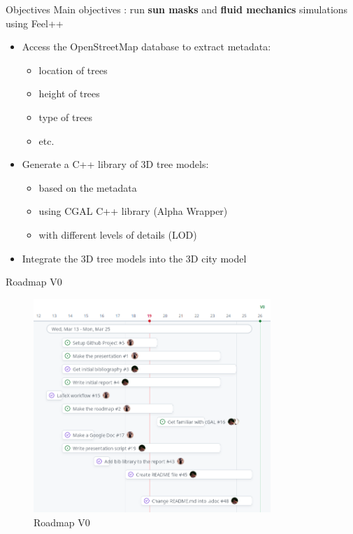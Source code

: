 \documentclass[10pt]{beamer}
\begin{document}
\begin{frame}{Objectives}
  Main objectives : run \textbf{sun masks} and \textbf{fluid mechanics} simulations using Feel++\cite{feel++} \\
  \vspace{0.5cm}

  \begin{itemize}
    \item<2-> Access the OpenStreetMap\cite{overpass} database to extract metadata:
    \begin{itemize}
      \item<3-> location of trees
      \item<4-> height of trees
      \item <5-> type of trees
      \item <6-> etc.
    \end{itemize}
    \item<7-> Generate a C++ library of 3D tree models:
    \begin{itemize}
      \item <8-> based on the metadata
      \item <9-> using CGAL\cite{cgal} C++ library (Alpha Wrapper)
      \item <10-> with different levels of details (LOD)
    \end{itemize}
    \item<11-> Integrate the 3D tree models into the 3D city model
  \end{itemize}
\end{frame}

\begin{frame}{Roadmap V0}
  \begin{figure}[h] %
    \centering
    \includegraphics[width=0.8\textwidth]{images/roadmap_v0.png}
    \caption{Roadmap V0} %
    \label{fig:roadmap0} %
    \end{figure}
\end{frame}
\end{document}
